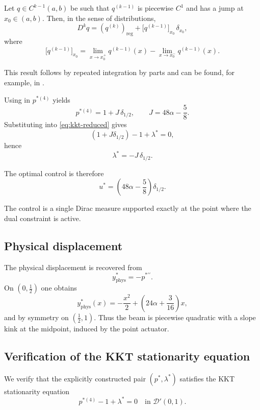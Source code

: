 \documentclass[11pt,a4paper]{article}
\begin{document}
\begin{lemma}
\label{lem:jump}
Let $q\in C^{k-1}(a,b)$ be such that $q^{(k-1)}$ is piecewise $C^1$ and has a jump
at $x_0\in(a,b)$.
Then, in the sense of distributions,
\[
D^k q
=
(q^{(k)})_{\mathrm{reg}}
+
\big[q^{(k-1)}\big]_{x_0}\,\delta_{x_0},
\]
where
\[
\big[q^{(k-1)}\big]_{x_0}
=
\lim_{x\to x_0^+} q^{(k-1)}(x)
-
\lim_{x\to x_0^-} q^{(k-1)}(x).
\]
\end{lemma}

This result follows by repeated integration by parts and can be found, for example, in \cite[Section~4.2]{Evans2010PDE}.

Using in $p^{*(4)}$ yields
\[
p^{*(4)} = 1 + J\,\delta_{1/2},
\qquad
J = 48\alpha - \frac{5}{8}.
\]
Substituting into \eqref{eq:kkt-reduced} gives
\[
(1+J\delta_{1/2}) - 1 + \lambda^* = 0,
\]
hence
\[
\lambda^* = - J\,\delta_{1/2}.
\]

The optimal control is therefore
\begin{equation}
\boxed{
u^* = \left(48\alpha - \frac{5}{8}\right)\delta_{1/2}.
}
\end{equation}

The control is a single Dirac measure supported exactly at the point where the
dual constraint is active.


\subsection*{Physical displacement}

The physical displacement is recovered from
\[
y_{\mathrm{phys}}^* = -p^{*\prime\prime}.
\]
On $(0,\tfrac12)$ one obtains
\[
y_{\mathrm{phys}}^*(x)
=
-\frac{x^2}{2}
+\left(24\alpha+\frac{3}{16}\right)x,
\]
and by symmetry on $(\tfrac12,1)$.
Thus the beam is piecewise quadratic with a slope kink at the midpoint, induced
by the point actuator.

\subsection{Verification of the KKT stationarity equation}
\label{subsec:distributional-verification}

We verify that the explicitly constructed pair $(p^*,\lambda^*)$ satisfies the
KKT stationarity equation
\begin{equation}
p^{*(4)} - 1 + \lambda^* = 0
\quad \text{in } \mathcal D'(0,1).
\label{eq:kkt-distributional}
\end{equation}
\end{document}
